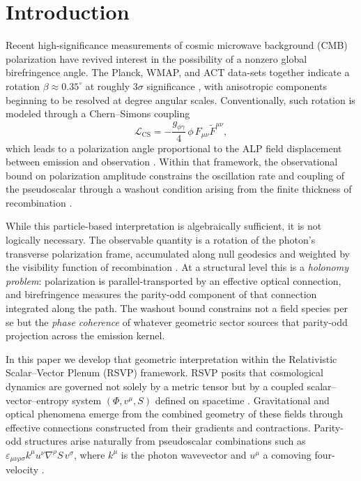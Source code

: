 \documentclass[12pt]{article}
\theoremstyle{definition}
\newcommand{\gpg}{g_{\phi\gamma}}
\begin{document}
\newpage

\section{Introduction}
\label{sec:intro}

Recent high-significance measurements of cosmic microwave background (CMB)
polarization have revived interest in the possibility of a nonzero global
birefringence angle.
The Planck, WMAP, and ACT data-sets together indicate a rotation
$\beta \approx 0.35^\circ$ at roughly $3\sigma$ significance
\cite{MinamiKomatsu2020,Eskilt2022,Diego-Palazuelos2023,ACTPol2024},
with anisotropic components beginning to be resolved at degree angular scales.
Conventionally, such rotation is modeled through a Chern--Simons coupling
\begin{equation}
  \mathcal{L}_{\mathrm{CS}}
  = -\frac{\gpg}{4}\,\phi\,F_{\mu\nu}\widetilde{F}^{\mu\nu},
  \label{eq:CS_action}
\end{equation}
which leads to a polarization angle proportional to the ALP field
displacement between emission and observation \cite{Carroll1990,Lue1999,
Finelli2009,Pospelov2009}.
Within that framework, the observational bound on polarization amplitude
constrains the oscillation rate and coupling of the pseudoscalar through a
washout condition arising from the finite thickness of recombination
\cite{Fujita2021,Sherfield2023,Murai2023}.

While this particle-based interpretation is algebraically sufficient, it is
not logically necessary.
The observable quantity is a rotation of the photon's transverse polarization
frame, accumulated along null geodesics and weighted by the visibility
function of recombination \cite{Zaldarriaga1998,Hu1997}.
At a structural level this is a \emph{holonomy problem}:
polarization is parallel-transported by an effective optical connection,
and birefringence measures the parity-odd component of that connection
integrated along the path.
The washout bound constrains not a field species per se
but the \emph{phase coherence} of whatever geometric sector sources that
parity-odd projection across the emission kernel.

In this paper we develop that geometric interpretation within the
Relativistic Scalar--Vector Plenum (RSVP) framework.
RSVP posits that cosmological dynamics are governed not solely by a metric
tensor but by a coupled scalar--vector--entropy system $(\Phi,v^\mu,S)$
defined on spacetime \cite{Penrose2004,Verlinde2011,Jacobson1995}.
Gravitational and optical phenomena emerge from the combined geometry of
these fields through effective connections constructed from their gradients
and contractions.
Parity-odd structures arise naturally from pseudoscalar combinations such as
$\varepsilon_{\mu\nu\rho\sigma} k^\mu u^\nu \nabla^\rho S\, v^\sigma$,
where $k^\mu$ is the photon wavevector and $u^\mu$ a comoving four-velocity
\cite{Alexander2009,Nair2010}.
\end{document}
